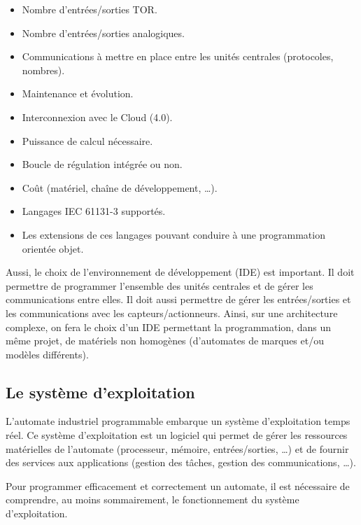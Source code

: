 \begin{minipage}{0.6\linewidth}
    \begin{itemize}
        \item Nombre d'entrées/sorties TOR.
        \item Nombre d'entrées/sorties analogiques.
        \item Communications à mettre en place entre les unités centrales (protocoles, nombres).
        \item Maintenance et évolution.
        \item Interconnexion avec le Cloud (4.0).
        \item Puissance de calcul nécessaire.
        \item Boucle de régulation intégrée ou non.
        \item Coût (matériel, chaîne de développement, \dots).
        \item Langages IEC 61131-3 supportés.
        \item Les extensions de ces langages pouvant conduire à une programmation orientée objet.
    \end{itemize}
\end{minipage}


Aussi, le choix de l'environnement de développement (IDE) est important. Il doit permettre de programmer l'ensemble des unités centrales et de gérer les communications entre elles. Il doit aussi permettre de gérer les entrées/sorties et les communications avec les capteurs/actionneurs. Ainsi, sur une architecture complexe, on fera le choix d'un IDE permettant la programmation, dans un même projet, de matériels non homogènes (d'automates de marques et/ou modèles différents).



\subsection{Le système d'exploitation}
L'automate industriel programmable embarque un système d'exploitation temps réel. Ce système d'exploitation est un logiciel qui permet de gérer les ressources matérielles de l'automate (processeur, mémoire, entrées/sorties, \dots) et de fournir des services aux applications (gestion des tâches, gestion des communications, \dots).

Pour programmer efficacement et correctement un automate, il est nécessaire de comprendre, au moins sommairement, le fonctionnement du système d'exploitation.

